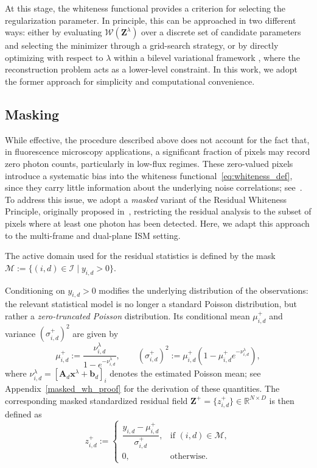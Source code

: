 \documentclass[letterpaper]{article}
\begin{document}
At this stage, the whiteness functional provides a criterion for selecting the regularization parameter. In principle, this can be approached in two different ways: either by evaluating $\mathcal W(\mathbf Z^\lambda)$ over a discrete set of candidate parameters and selecting the minimizer through a grid-search strategy, or by directly optimizing with respect to $\lambda$ within a bilevel variational framework \cite{SantambrogioWP,PragliolaBilevelWP}, where the reconstruction problem acts as a lower-level constraint. In this work, we adopt the former approach for simplicity and computational convenience.

\subsection{Masking}
\label{sec:masked_wp}

While effective, the procedure described above does not account for the fact that, in fluorescence microscopy applications, a significant fraction of pixels may record zero photon counts, particularly in low-flux regimes. These zero-valued pixels introduce a systematic bias into the whiteness functional~\eqref{eq:whiteness_def}, since they carry little information about the underlying noise correlations; see~\cite{carl_blanc_f,Bevilacqua_2023}. To address this issue, we adopt a \emph{masked} variant of the Residual Whiteness Principle, originally proposed in~\cite{Bevilacqua_2023}, restricting the residual analysis to the subset of pixels where at least one photon has been detected. Here, we adapt this approach to the multi-frame and dual-plane ISM setting.

The active domain used for the residual statistics is defined by the mask
$
    \mathcal M
    :=
    \{
    (i,d)\in\mathcal I
    \mid
    y_{i,d}>0
    \}.
$

Conditioning on $y_{i,d}>0$ modifies the underlying distribution of the observations: the relevant statistical model is no longer a standard Poisson distribution, but rather a \emph{zero-truncated Poisson} distribution. Its conditional mean $\mu_{i,d}^+$ and variance $(\sigma_{i,d}^+)^2$ are given by
\begin{equation}
    \mu_{i,d}^{+}
    :=
    \frac{\nu_{i,d}^\lambda}
    {1-e^{-\nu_{i,d}^\lambda}},
    \qquad
    (\sigma_{i,d}^{+})^2
    :=
    \mu_{i,d}^{+}
    \left(
    1-\mu_{i,d}^{+}e^{-\nu_{i,d}^\lambda}
    \right),
\end{equation}
where
$
\nu_{i,d}^\lambda
=
[\mathbf A_d\mathbf x^\lambda+\mathbf b_d]_i
$
denotes the estimated Poisson mean; see Appendix~\ref{masked_wh_proof} for the derivation of these quantities. The corresponding masked standardized residual field
$
\mathbf Z^{+}
=
\{z_{i,d}^{+}\}
\in
\mathbb R^{N\times D}
$
is then defined as
\begin{equation}
    z_{i,d}^{+}
    :=
    \begin{cases}
        \dfrac{
        y_{i,d}-\mu_{i,d}^{+}
        }{
        \sigma_{i,d}^{+}
        },
        & \text{if } (i,d)\in\mathcal M,
        \\[8pt]
        0,
        & \text{otherwise.}
    \end{cases}
\end{equation}
\end{document}
